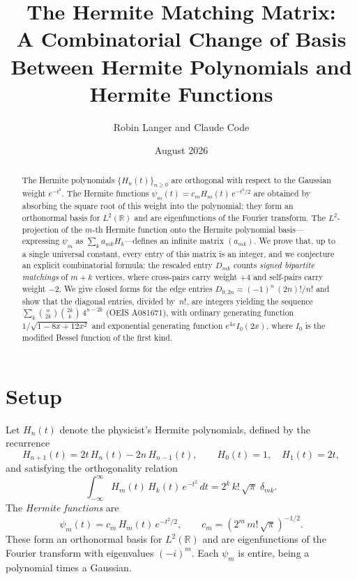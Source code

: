 \documentclass[11pt,a4paper]{article}
\title{\textbf{The Hermite Matching Matrix:\\
A Combinatorial Change of Basis\\
Between Hermite Polynomials and Hermite Functions}}
\author{Robin Langer and Claude Code}
\date{August 2026}
\theoremstyle{definition}
\theoremstyle{plain}
\newcommand{\R}{\mathbb{R}}
\begin{document}
\maketitle

\begin{abstract}
The Hermite polynomials $\{H_n(t)\}_{n \ge 0}$ are orthogonal with
respect to the Gaussian weight $e^{-t^2}$. The Hermite functions
$\psi_m(t) = c_m H_m(t)\, e^{-t^2/2}$ are obtained by absorbing the
square root of this weight into the polynomial; they form an orthonormal
basis for $L^2(\mathbb{R})$ and are eigenfunctions of the Fourier
transform. The $L^2$-projection of the $m$-th Hermite function onto the
Hermite polynomial basis---expressing $\psi_m$ as $\sum_k a_{mk} H_k$---defines
an infinite matrix $(a_{mk})$. We prove that, up to a single universal
constant, every entry of this matrix is an integer, and we conjecture an
explicit combinatorial formula: the rescaled entry $D_{mk}$ counts
\emph{signed bipartite matchings} of $m+k$ vertices, where cross-pairs
carry weight $+4$ and self-pairs carry weight $-2$. We give closed forms
for the edge entries $D_{0,2n} = (-1)^n\,(2n)!/n!$ and show that the
diagonal entries, divided by~$n!$, are integers yielding
the sequence
$\sum_k \binom{n}{2k}\binom{2k}{k}\,4^{n-2k}$ (OEIS A081671), with ordinary
generating function $1/\sqrt{1 - 8x + 12x^2}$ and exponential generating
function $e^{4x} I_0(2x)$, where $I_0$ is the modified Bessel function of
the first kind.
\end{abstract}

\section{Setup}

Let $H_n(t)$ denote the physicist's Hermite polynomials, defined by the
recurrence
\[
  H_{n+1}(t) = 2t\, H_n(t) - 2n\, H_{n-1}(t),
  \qquad H_0(t) = 1,\quad H_1(t) = 2t,
\]
and satisfying the orthogonality relation
\begin{equation}\label{eq:hermite-orth}
  \int_{-\infty}^{\infty} H_m(t)\, H_k(t)\, e^{-t^2}\, dt
  = 2^k\, k!\, \sqrt{\pi}\; \delta_{mk}.
\end{equation}
The \emph{Hermite functions} are
\begin{equation}\label{eq:hermite-fn}
  \psi_m(t) = c_m\, H_m(t)\, e^{-t^2/2},
  \qquad c_m = (2^m\, m!\, \sqrt{\pi})^{-1/2}.
\end{equation}
These form an orthonormal basis for $L^2(\R)$ and are eigenfunctions of
the Fourier transform with eigenvalues $(-i)^m$. Each $\psi_m$ is
entire, being a polynomial times a Gaussian.
\end{document}
